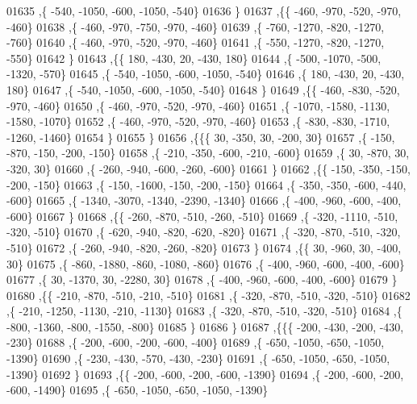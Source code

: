 \begin{DoxyCode}
01635     ,\{  -540, -1050,  -600, -1050,  -540\}
01636     \}
01637    ,\{\{  -460,  -970,  -520,  -970,  -460\}
01638     ,\{  -460,  -970,  -750,  -970,  -460\}
01639     ,\{  -760, -1270,  -820, -1270,  -760\}
01640     ,\{  -460,  -970,  -520,  -970,  -460\}
01641     ,\{  -550, -1270,  -820, -1270,  -550\}
01642     \}
01643    ,\{\{   180,  -430,    20,  -430,   180\}
01644     ,\{  -500, -1070,  -500, -1320,  -570\}
01645     ,\{  -540, -1050,  -600, -1050,  -540\}
01646     ,\{   180,  -430,    20,  -430,   180\}
01647     ,\{  -540, -1050,  -600, -1050,  -540\}
01648     \}
01649    ,\{\{  -460,  -830,  -520,  -970,  -460\}
01650     ,\{  -460,  -970,  -520,  -970,  -460\}
01651     ,\{ -1070, -1580, -1130, -1580, -1070\}
01652     ,\{  -460,  -970,  -520,  -970,  -460\}
01653     ,\{  -830,  -830, -1710, -1260, -1460\}
01654     \}
01655    \}
01656   ,\{\{\{    30,  -350,    30,  -200,    30\}
01657     ,\{  -150,  -870,  -150,  -200,  -150\}
01658     ,\{  -210,  -350,  -600,  -210,  -600\}
01659     ,\{    30,  -870,    30,  -320,    30\}
01660     ,\{  -260,  -940,  -600,  -260,  -600\}
01661     \}
01662    ,\{\{  -150,  -350,  -150,  -200,  -150\}
01663     ,\{  -150, -1600,  -150,  -200,  -150\}
01664     ,\{  -350,  -350,  -600,  -440,  -600\}
01665     ,\{ -1340, -3070, -1340, -2390, -1340\}
01666     ,\{  -400,  -960,  -600,  -400,  -600\}
01667     \}
01668    ,\{\{  -260,  -870,  -510,  -260,  -510\}
01669     ,\{  -320, -1110,  -510,  -320,  -510\}
01670     ,\{  -620,  -940,  -820,  -620,  -820\}
01671     ,\{  -320,  -870,  -510,  -320,  -510\}
01672     ,\{  -260,  -940,  -820,  -260,  -820\}
01673     \}
01674    ,\{\{    30,  -960,    30,  -400,    30\}
01675     ,\{  -860, -1880,  -860, -1080,  -860\}
01676     ,\{  -400,  -960,  -600,  -400,  -600\}
01677     ,\{    30, -1370,    30, -2280,    30\}
01678     ,\{  -400,  -960,  -600,  -400,  -600\}
01679     \}
01680    ,\{\{  -210,  -870,  -510,  -210,  -510\}
01681     ,\{  -320,  -870,  -510,  -320,  -510\}
01682     ,\{  -210, -1250, -1130,  -210, -1130\}
01683     ,\{  -320,  -870,  -510,  -320,  -510\}
01684     ,\{  -800, -1360,  -800, -1550,  -800\}
01685     \}
01686    \}
01687   ,\{\{\{  -200,  -430,  -200,  -430,  -230\}
01688     ,\{  -200,  -600,  -200,  -600,  -400\}
01689     ,\{  -650, -1050,  -650, -1050, -1390\}
01690     ,\{  -230,  -430,  -570,  -430,  -230\}
01691     ,\{  -650, -1050,  -650, -1050, -1390\}
01692     \}
01693    ,\{\{  -200,  -600,  -200,  -600, -1390\}
01694     ,\{  -200,  -600,  -200,  -600, -1490\}
01695     ,\{  -650, -1050,  -650, -1050, -1390\}

\end{DoxyCode}
